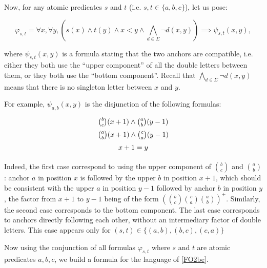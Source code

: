 \documentclass[a4paper,UKenglish,cleveref, autoref, thm-restate]{lipics-v2021}
\begin{document}
    
Now, for any atomic predicates $s$ and $t$ (i.e. $s,t\in\{a,b,c\}$), let us pose:

$$
\varphi_{s,t} = \forall x, \forall y,
\left(
    s(x) \land t(y) \land x<y \land \bigwedge_{d \in \Sigma} \neg d(x,y)
\right)
\implies
\psi_{s,t}(x,y),
$$


where $\psi_{s,t}(x,y)$ is a formula stating that the two anchors are compatible, i.e. either they both use the ``upper component'' of all the double letters between them, or they both use the ``bottom component''.
Recall that $\bigwedge_{d \in \Sigma}\neg d(x,y)$ means that there is no singleton letter between $x$ and $y$.

For example, $\psi_{a,b}(x,y)$ is the disjunction of the following formulas:
$$
\def\arraystretch{1.5}
    \begin{array}{c}
\binom{b}{c}(x+1)  \wedge \binom{a}{b}(y-1)\\
 \binom{a}{b}(x+1)  \wedge  \binom{c}{a}(y-1)\\
x+1=y
\end{array}
$$

Indeed, the first case correspond to using the upper component of $\binom{b}{c}$ and $\binom{a}{b}$: anchor $a$ in position $x$ is followed by the upper $b$ in position $x+1$, which should be consistent with the upper $a$ in position $y-1$ followed by anchor $b$ in position $y$, the factor from $x+1$ to $y-1$ being of the form $(\binom{b}{c}\binom{c}{a} \binom{a}{b})^+$. 
Similarly, the second case corresponds to the bottom component.
The last case corresponds to anchors directly following each other, without an intermediary factor of double letters. This case appears only for $(s,t)\in\{(a,b),(b,c),(c,a)\}$

Now using the conjunction of all formulas $\varphi_{s,t}$ where $s$ and $t$ are atomic predicates $a,b,c$, we build a formula for the language of \cref{FO2be}.
\end{document}
